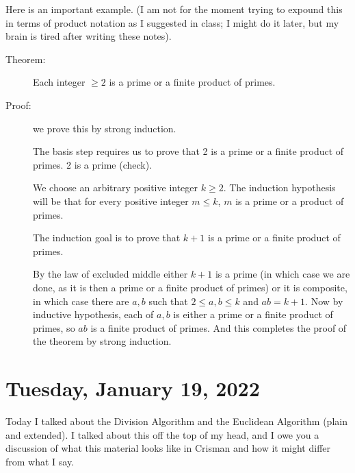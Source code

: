 \documentclass[12pt]{article}
\begin{document}
Here is an important example.  (I am not for the moment trying to expound this in terms of product notation as I suggested in class;  I might do it later, but my brain is tired after writing these notes).

\begin{description}

\item[Theorem:]  Each integer $\geq 2$ is a prime or a finite product of primes.

\item[Proof:]

we prove this by strong induction.

The basis step requires us to prove that 2 is a prime or a finite product of primes.  2 is a prime (check).

We choose an arbitrary positive integer $k\geq 2$.  The induction hypothesis will be that for every positive integer $m \leq k$, $m$ is a prime or a product of primes.

The induction goal is to prove that $k+1$ is a prime or a finite product of primes.

By the law of excluded middle either $k+1$ is a prime (in which case we are done, as it is then a prime or a finite product of primes)
or it is composite, in which case there are $a,b$ such that $2 \leq a,b \leq k$ and $ab=k+1$.  Now by inductive hypothesis, each of $a,b$ is either a prime or a finite product of primes, so $ab$ is a finite product of primes.  And this completes the proof of the theorem by strong induction.

\end{description}

\section{Tuesday, January 19, 2022}

Today I talked about the Division Algorithm and the Euclidean Algorithm (plain and extended).  I talked about this off the top of my head, and I owe you a discussion of what this material looks like in Crisman and how it might differ from what I say.
\end{document}
